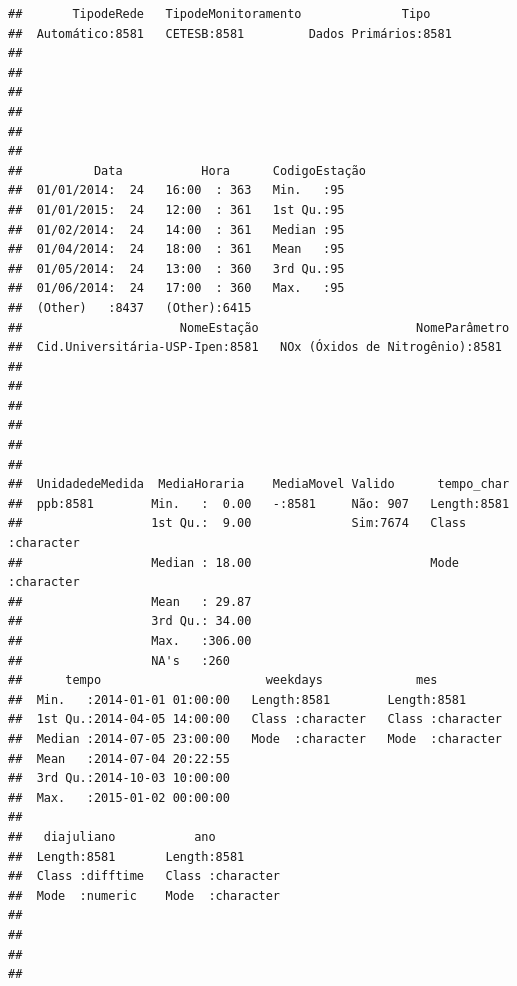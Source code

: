 \documentclass[]{book}
\theoremstyle{definition}
\theoremstyle{definition}
\theoremstyle{definition}
\theoremstyle{remark}
\begin{document}
\begin{verbatim}
##       TipodeRede   TipodeMonitoramento              Tipo     
##  Automático:8581   CETESB:8581         Dados Primários:8581  
##                                                              
##                                                              
##                                                              
##                                                              
##                                                              
##                                                              
##          Data           Hora      CodigoEstação
##  01/01/2014:  24   16:00  : 363   Min.   :95   
##  01/01/2015:  24   12:00  : 361   1st Qu.:95   
##  01/02/2014:  24   14:00  : 361   Median :95   
##  01/04/2014:  24   18:00  : 361   Mean   :95   
##  01/05/2014:  24   13:00  : 360   3rd Qu.:95   
##  01/06/2014:  24   17:00  : 360   Max.   :95   
##  (Other)   :8437   (Other):6415                
##                      NomeEstação                      NomeParâmetro 
##  Cid.Universitária-USP-Ipen:8581   NOx (Óxidos de Nitrogênio):8581  
##                                                                     
##                                                                     
##                                                                     
##                                                                     
##                                                                     
##                                                                     
##  UnidadedeMedida  MediaHoraria    MediaMovel Valido      tempo_char       
##  ppb:8581        Min.   :  0.00   -:8581     Não: 907   Length:8581       
##                  1st Qu.:  9.00              Sim:7674   Class :character  
##                  Median : 18.00                         Mode  :character  
##                  Mean   : 29.87                                           
##                  3rd Qu.: 34.00                                           
##                  Max.   :306.00                                           
##                  NA's   :260                                              
##      tempo                       weekdays             mes           
##  Min.   :2014-01-01 01:00:00   Length:8581        Length:8581       
##  1st Qu.:2014-04-05 14:00:00   Class :character   Class :character  
##  Median :2014-07-05 23:00:00   Mode  :character   Mode  :character  
##  Mean   :2014-07-04 20:22:55                                        
##  3rd Qu.:2014-10-03 10:00:00                                        
##  Max.   :2015-01-02 00:00:00                                        
##                                                                     
##   diajuliano           ano           
##  Length:8581       Length:8581       
##  Class :difftime   Class :character  
##  Mode  :numeric    Mode  :character  
##                                      
##                                      
##                                      
## 
\end{verbatim}
\end{document}
